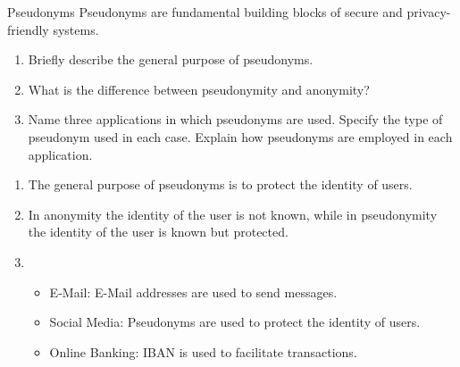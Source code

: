 \documentclass{article}
\begin{document}
\begin{exercise}{Pseudonyms}
  Pseudonyms are fundamental building blocks of secure and privacy-friendly systems.
  \begin{enumerate}
    \item Briefly describe the general purpose of pseudonyms.
    \item What is the difference between pseudonymity and anonymity?
    \item Name three applications in which pseudonyms are used. Specify the type of pseudonym used in each case. Explain how pseudonyms are employed in each application.
  \end{enumerate}

  \begin{solution}
    \begin{enumerate}
      \item The general purpose of pseudonyms is to protect the identity of users.
      \item In anonymity the identity of the user is not known, while in pseudonymity the identity of the user is known but protected.
      \item \begin{itemize}
          \item E-Mail: E-Mail addresses are used to send messages.
          \item Social Media: Pseudonyms are used to protect the identity of users.
          \item Online Banking: IBAN is used to facilitate transactions.
        \end{itemize}
    \end{enumerate}
  \end{solution}
\end{exercise}
\end{document}
